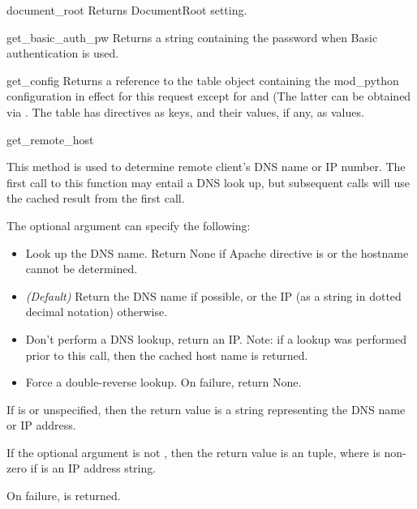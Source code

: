 \begin{methoddesc}[request]{document_root}{}
  Returns DocumentRoot setting.
\end{methoddesc}

\begin{methoddesc}[request]{get_basic_auth_pw}{}
  Returns a string containing the password when Basic authentication is
  used.
\end{methoddesc}

\begin{methoddesc}[request]{get_config}{}
  Returns a reference to the table object containing the mod_python
  configuration in effect for this request except for
   and  (The latter can be
  obtained via . The table has directives as
  keys, and their values, if any, as values.
\end{methoddesc}

\begin{methoddesc}[request]{get_remote_host}{}

  This method is used to determine remote client's DNS name or IP
  number. The first call to this function may entail a DNS look up, but
  subsequent calls will use the cached result from the first call.

  The optional  argument can specify the following: 

  \begin{itemize}

  \item
     Look up the DNS name. Return None if Apache
    directive  is  or the hostname cannot
    be determined.

  \item                  
     \emph{(Default)} Return the DNS name if
    possible, or the IP (as a string in dotted decimal notation)
    otherwise.

  \item
     Don't perform a DNS lookup, return an
    IP. Note: if a lookup was performed prior to this call, then the
    cached host name is returned.

  \item
     Force a double-reverse lookup. On 
    failure, return None.

  \end{itemize}

  If  is  or unspecified, then the return
  value is a string representing the DNS name or IP address.

  If the optional  argument is not , then the
  return value is an  tuple, where 
  is non-zero if  is an IP address string.

  On failure,  is returned.

\end{methoddesc}

